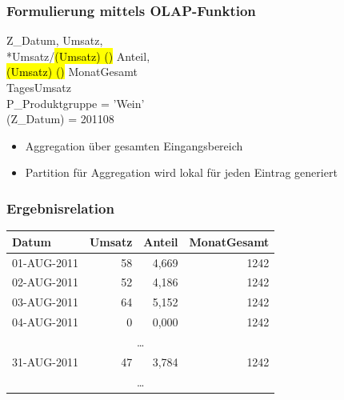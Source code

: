     
    \begin{frame}
    
    \frametitle{Formulierung mittels OLAP-Funktion}
    
    \begin{sql}
     Z\_Datum, Umsatz, \\
    *Umsatz/\hl{(Umsatz) ()}  Anteil, \\
    \1 \hl{(Umsatz) ()}  MonatGesamt \\
      TagesUmsatz \\
      P\_Produktgruppe = 'Wein'  \\
    \1 (Z\_Datum) = 201108
      \end{sql}
    
      \begin{itemize}
      \item Aggregation über gesamten Eingangsbereich
      \item Partition für Aggregation wird lokal für jeden Eintrag
        generiert
      \end{itemize}
    
    \end{frame}
    
    \begin{frame}
    
    \frametitle{Ergebnisrelation}
    
    \begin{center}
    {\small
    \begin{tabular}{|l|r|r|r|}
    \hline
    \rowcolor{Gray} Datum & Umsatz & Anteil & MonatGesamt \\
    \hline\hline
    {01-AUG-2011} & {58} & {4,669} & {1242} \\
    {02-AUG-2011} & {52} & {4,186} & {1242} \\
    {03-AUG-2011} & {64} & {5,152}& {1242} \\
    {04-AUG-2011} & {0} & {0,000} & {1242} \\
    \multicolumn{4}{|c|}{\dots} \\
    {31-AUG-2011} & {47} & {3,784} & {1242} \\
    \multicolumn{4}{|c|}{\dots} \\
    \hline
    \end{tabular}}
    \end{center}
    
    \end{frame}
    
